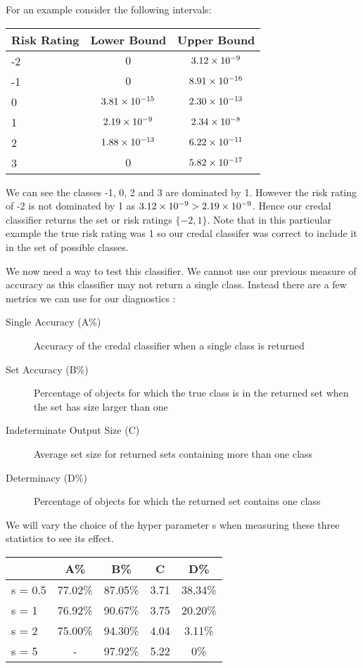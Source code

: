 For an example consider the following intervals:
\begin{center}
	\begin{tabular}{l|c c}
	Risk Rating & Lower Bound & Upper Bound \\
	\hline
	-2          & $0$              & ${3.12}\times 10^{-9}$  \\
	-1          & $0$              & ${8.91}\times 10^{-16}$ \\
	0           & ${3.81}\times 10^{-15}$ & ${2.30}\times 10^{-13}$ \\
	1           & ${2.19}\times 10^{-9}$  & ${2.34}\times 10^{-8}$  \\
	2           & ${1.88}\times 10^{-13}$ & ${6.22}\times 10^{-11}$ \\
	3           & $0$              & ${5.82}\times 10^{-17}$ \\
	\end{tabular}
\end{center}
We can see the classes -1, 0, 2 and 3 are dominated by 1.
However the risk rating of -2 is not dominated by 1 as ${3.12}\times 10^{-9} > {2.19}\times 10^{-9}$.
Hence our credal classifier returns the set or risk ratings $\{-2, 1\}$.
Note that in this particular example the true risk rating was 1 so our credal classifer was correct to include it in the set of possible classes.

We now need a way to test this classifier.
We cannot use our previous measure of accuracy as this classifier may not return a single class.
Instead there are a few metrics we can use for our diagnostics \cite{Antonucci11}:
\begin{description}
	\item[Single Accuracy (A\%)] Accuracy of the credal classifier when a single class is returned
	\item[Set Accuracy (B\%)] Percentage of objects for which the true class is in the returned set when the set has size larger than one
	\item[Indeterminate Output Size (C)] Average set size for returned sets containing more than one class
	\item[Determinacy (D\%)] Percentage of objects for which the returned set contains one class
\end{description}

We will vary the choice of the hyper parameter s when measuring these three statistics to see its effect.
\begin{center}
\begin{tabular}{l|c c c c}
        & A\%     & B\%     & C    & D\%     \\
\hline
s = 0.5 & 77.02\% & 87.05\% & 3.71 & 38.34\% \\
s = 1   & 76.92\% & 90.67\% & 3.75 & 20.20\% \\
s = 2   & 75.00\% & 94.30\% & 4.04 & 3.11\% \\
s = 5   & -       & 97.92\% & 5.22 & 0\%   \\
\end{tabular}
\end{center}

